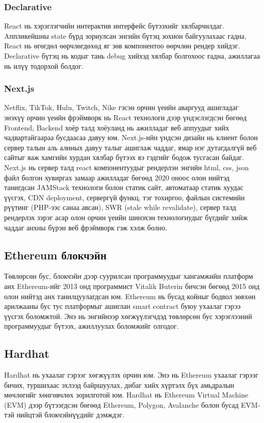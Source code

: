 \subsubsection{Declarative}
React нь хэрэглэгчийн интерактив интерфейс бүтээхийг хялбарчилдаг. Aппликейшны state бүрд зориулсан энгийн бүтэц зохион байгуулахаас гадна, React нь өгөгдөл өөрчлөгдөхөд яг зөв компонентоо өөрчлөн рендер хийдэг. Declarative бүтэц нь кодыг тань debug хийхэд хялбар болгохоос гадна, ажиллагаа нь илүү тодорхой болдог.

\subsubsection{Next.js}
Netflix, TikTok, Hulu, Twitch, Nike гэсэн орчин үеийн аваргууд ашигладаг энэхүү орчин үеийн фрэймворк нь React технологи дээр үндэслэгдсэн бөгөөд Frontend, Backend хоёр талд хоёуланд нь ажилладаг веб аппуудыг хийх чадвартайгаараа бусдаасаа давуу юм. Next.js-ийн үндсэн дизайн нь клиент болон сервер талын аль алиных давуу талыг ашиглаж чаддаг, ямар нэг дутагдалгүй веб сайтыг яаж хамгийн хурдан хялбар бүтээх вэ гэдгийг бодож тусгасан байдаг. Next.js нь сервер талд react компонентуудыг рендерлэн энгийн html, css, json файл болгон хувиргах замаар ажилладаг бөгөөд 2020 оноос олон нийтэд танигдсан JAMStack технологи болон статик сайт, автоматаар статик хуудас үүсгэх, CDN deployment, сервергүй функц, тэг тохиргоо, файлын системийн рүүтинг (PHP-ээс санаа авсан), SWR (stale while revalidate), сервер талд рендерлэх зэрэг асар олон орчин үеийн шинэхэн технологиудыг бүгдийг хийж чаддаг анхны бүрэн веб фрэймворк гэж хэлж болно.

\subsection{Ethereum блокчэйн}
Төвлөрсөн бус, блокчэйн дээр суурилсан программуудыг хангамжийн платформ анх Ethereum-ийг 2013 онд программист Vitalik Buterin бичсэн бөгөөд 2015 онд олон нийтэд анх танилцуулагдсан юм. Ethereum нь бусад койныг бодвол зөвхөн арилжааны бус тус платформыг ашиглан smart contract буюу ухаалаг гэрээ үүсгэх боломжтой. Энэ нь энгийнээр хөгжүүлэгчдэд төвлөрсөн бус хэрэглээний программуудыг бүтээх, ажиллуулах боломжийг олгодог.

\subsection{Hardhat}
Hardhat нь ухаалаг гэрээг хөгжүүлэх орчин юм. Энэ нь Ethereum ухаалаг гэрээг бичих, туршихаас эхлээд байршуулах, дибаг хийх хүртэлх бүх амьдралын мөчлөгийг хөнгөвчлөх зорилготой юм. Hardhat нь Ethereum Virtual Machine (EVM) дээр бүтээгдсэн бөгөөд Ethereum, Polygon, Avalanche болон бусад EVM-тэй нийцтэй блокчэйнүүдийг дэмждэг.

